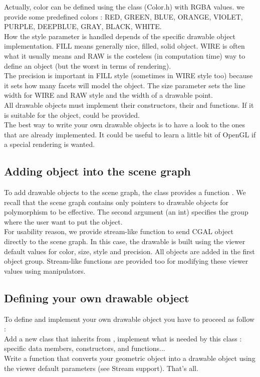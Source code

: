 Actually, color can be defined using the class  (Color.h) with
RGBA values. we provide some predefined colors : RED, GREEN, BLUE,
ORANGE, VIOLET, PURPLE, DEEPBLUE, GRAY, BLACK, WHITE.\\
How the style parameter is handled depends of the specific drawable
object implementation. FILL means generally nice, filled, solid
object. WIRE is often what it usually means and RAW is the costeless
(in computation time) way to define an object (but the worst in terms
of rendering).\\
The precision is important in FILL style (sometimes in WIRE style
too) because it sets how many facets will model the object. The size
parameter 
sets the line width for WIRE and RAW style and the width of a drawable
point. \\
All drawable objects must implement their constructors, their
 and  functions. If it is suitable for
the object,  could be provided.\\
The best way to write your own drawable objects is to have a look to
the ones that are already implemented. It could be useful to learn a 
little bit of OpenGL if a special rendering is wanted.

\subsection{Adding object into the scene graph}

To add drawable objects to the scene graph, the  class 
provides a function . We recall that the scene graph contains only pointers to
drawable objects for polymorphism to be effective. The second
argument (an int) specifies the group where the user want to put the
object. \\
For usability reason, we provide stream-like function to send 
CGAL object directly to the scene graph. In this case, the drawable is built
using the viewer default values for color, size, style and
precision. All objects are added in the first object
group. Stream-like functions are provided too for modifying these
viewer values using manipulators.

\subsection{Defining your own drawable object}

To define and implement your own drawable object you have to proceed
as follow : \\
Add a new class that inherits from , implement
what is needed by this class : specific data members, constructors,
 and  functions...\\
Write a  function that converts your geometric object into
a drawable object using the viewer default parameters (see Stream support). That's all.

